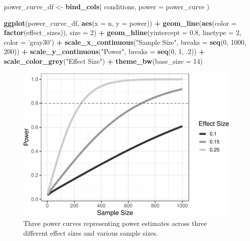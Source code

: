 \documentclass[man,mask,floatsintext]{apa6}
\newenvironment{Shaded}{\begin{snugshade}}{\end{snugshade}}
\newcommand{\DataTypeTok}[1]{\textcolor[rgb]{0.13,0.29,0.53}{#1}}
\newcommand{\DecValTok}[1]{\textcolor[rgb]{0.00,0.00,0.81}{#1}}
\newcommand{\FloatTok}[1]{\textcolor[rgb]{0.00,0.00,0.81}{#1}}
\newcommand{\KeywordTok}[1]{\textcolor[rgb]{0.13,0.29,0.53}{\textbf{#1}}}
\newcommand{\NormalTok}[1]{#1}
\newcommand{\OperatorTok}[1]{\textcolor[rgb]{0.81,0.36,0.00}{\textbf{#1}}}
\newcommand{\StringTok}[1]{\textcolor[rgb]{0.31,0.60,0.02}{#1}}
\begin{document}
\begin{Shaded}
\begin{Highlighting}[]
\NormalTok{power_curve_df <-}\StringTok{ }\KeywordTok{bind_cols}\NormalTok{(}
\NormalTok{  conditions, }
  \DataTypeTok{power =}\NormalTok{ power_curve}
\NormalTok{)}

\KeywordTok{ggplot}\NormalTok{(power_curve_df, }\KeywordTok{aes}\NormalTok{(}\DataTypeTok{x =}\NormalTok{ n, }\DataTypeTok{y =}\NormalTok{ power)) }\OperatorTok{+}\StringTok{ }
\StringTok{  }\KeywordTok{geom_line}\NormalTok{(}\KeywordTok{aes}\NormalTok{(}\DataTypeTok{color =} \KeywordTok{factor}\NormalTok{(effect_sizes)), }\DataTypeTok{size =} \DecValTok{2}\NormalTok{) }\OperatorTok{+}\StringTok{ }
\StringTok{  }\KeywordTok{geom_hline}\NormalTok{(}\DataTypeTok{yintercept =} \FloatTok{0.8}\NormalTok{, }\DataTypeTok{linetype =} \DecValTok{2}\NormalTok{, }\DataTypeTok{color =} \StringTok{'gray30'}\NormalTok{) }\OperatorTok{+}\StringTok{ }
\StringTok{  }\KeywordTok{scale_x_continuous}\NormalTok{(}\StringTok{"Sample Size"}\NormalTok{, }\DataTypeTok{breaks =} \KeywordTok{seq}\NormalTok{(}\DecValTok{0}\NormalTok{, }\DecValTok{1000}\NormalTok{, }\DecValTok{200}\NormalTok{)) }\OperatorTok{+}\StringTok{ }
\StringTok{  }\KeywordTok{scale_y_continuous}\NormalTok{(}\StringTok{"Power"}\NormalTok{, }\DataTypeTok{breaks =} \KeywordTok{seq}\NormalTok{(}\DecValTok{0}\NormalTok{, }\DecValTok{1}\NormalTok{, }\FloatTok{.2}\NormalTok{)) }\OperatorTok{+}
\StringTok{  }\KeywordTok{scale_color_grey}\NormalTok{(}\StringTok{"Effect Size"}\NormalTok{) }\OperatorTok{+}
\StringTok{  }\KeywordTok{theme_bw}\NormalTok{(}\DataTypeTok{base_size =} \DecValTok{14}\NormalTok{)}
\end{Highlighting}
\end{Shaded}

\begin{figure}
\centering
\includegraphics{power_simulation_files/figure-latex/vis-power-curve-1.pdf}
\caption{\label{fig:vis-power-curve}Three power curves representing power estimates across three different effect sizes and various sample sizes.}
\end{figure}
\end{document}
